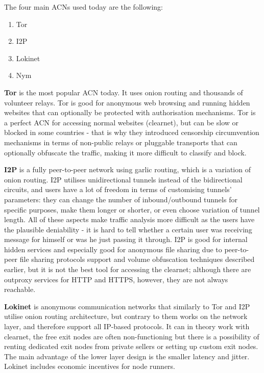 The four main ACNs used today are the following:
\begin{enumerate}
    \item Tor
    \item I2P
    \item Lokinet
    \item Nym
\end{enumerate}

\textbf{Tor} is the most popular ACN today. It uses onion routing and thousands of volunteer relays. Tor is good for anonymous web browsing and running hidden websites that can optionally be protected with authorisation mechanisms. Tor is a perfect ACN for accessing normal websites (clearnet), but can be slow or blocked in some countries - that is why they introduced censorship circumvention mechanisms in terms of non-public relays or pluggable transports that can optionally obfuscate the traffic, making it more difficult to classify and block.

\textbf{I2P} is a fully peer-to-peer network using garlic routing, which is a variation of onion routing. I2P utilises unidirectional tunnels instead of the bidirectional circuits, and users have a lot of freedom in terms of customising tunnels' parameters: they can change the number of inbound/outbound tunnels for specific purposes, make them longer or shorter, or even choose variation of tunnel length. All of these aspects make traffic analysis more difficult as the users have the plausible deniability - it is hard to tell whether a certain user was receiving message for himself or was he just passing it through. I2P is good for internal hidden services and especially good for anonymous file sharing due to peer-to-peer file sharing protocols support and volume obfuscation techniques described earlier, but it is not the best tool for accessing the clearnet; although there are outproxy services for HTTP and HTTPS, however, they are not always reachable.

\textbf{Lokinet} is anonymous communication networks that similarly to Tor and I2P utilise onion routing architecture, but contrary to them works on the network layer, and therefore support all IP-based protocols. It can in theory work with clearnet, the free exit nodes are often non-functioning but there is a possibility of renting dedicated exit nodes from private sellers or setting up custom exit nodes. The main advantage of the lower layer design is the smaller latency and jitter. Lokinet includes economic incentives for node runners.


